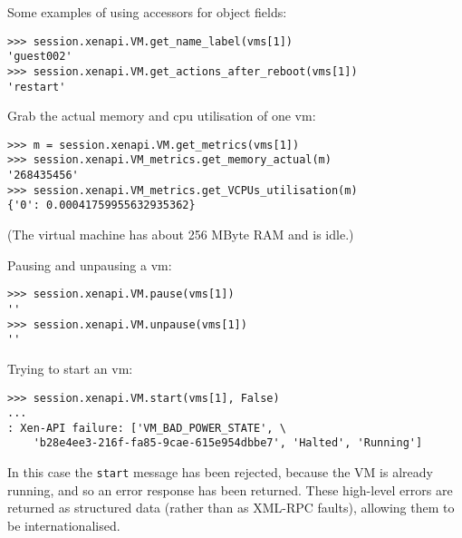 Some examples of using accessors for object fields:
\begin{verbatim}
>>> session.xenapi.VM.get_name_label(vms[1])
'guest002'
>>> session.xenapi.VM.get_actions_after_reboot(vms[1])
'restart'
\end{verbatim}

Grab the actual memory and cpu utilisation of one vm:
\begin{verbatim}
>>> m = session.xenapi.VM.get_metrics(vms[1])
>>> session.xenapi.VM_metrics.get_memory_actual(m)
'268435456'
>>> session.xenapi.VM_metrics.get_VCPUs_utilisation(m)
{'0': 0.00041759955632935362}
\end{verbatim}
(The virtual machine has about 256 MByte RAM and is idle.)

Pausing and unpausing a vm:
\begin{verbatim}
>>> session.xenapi.VM.pause(vms[1])
''
>>> session.xenapi.VM.unpause(vms[1])
''
\end{verbatim}

Trying to start an vm:
\begin{verbatim}
>>> session.xenapi.VM.start(vms[1], False)
...
: Xen-API failure: ['VM_BAD_POWER_STATE', \
    'b28e4ee3-216f-fa85-9cae-615e954dbbe7', 'Halted', 'Running']
\end{verbatim}

In this case the {\tt start} message has been rejected, because the VM is
already running, and so an error response has been returned.  These high-level
errors are returned as structured data (rather than as XML-RPC faults),
allowing them to be internationalised.  

